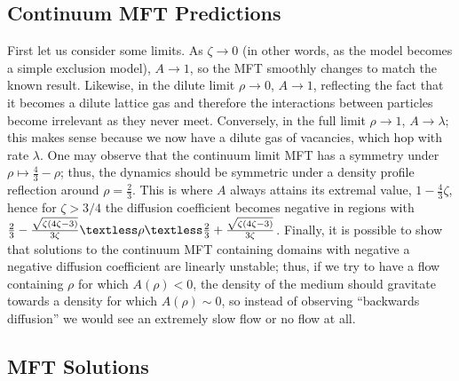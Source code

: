 \subsection{Continuum MFT Predictions}
First let us consider some limits. As $\zeta \rightarrow 0$ (in other words, as the model becomes a simple exclusion model), $A \rightarrow 1$, so the MFT smoothly changes to match the known result. Likewise, in the
dilute limit $\rho \rightarrow 0$, $A \rightarrow 1$, reflecting the fact that it becomes a dilute lattice gas and therefore the interactions between particles become irrelevant as they never meet.
Conversely, in the full limit $\rho \rightarrow 1$, $A \rightarrow \lambda$; this makes sense because we now have a dilute gas of vacancies, which hop with rate $\lambda$.
One may observe that the continuum limit MFT has a symmetry under $\rho \mapsto \frac{4}{3} - \rho$; thus, the dynamics should be symmetric under a density profile reflection around $\rho = \frac{2}{3}$. This is where $A$ always
attains its extremal value, $ 1 - \frac{4}{3}\zeta$, hence for $\zeta>3/4$ the diffusion coefficient becomes negative in regions with
$\frac{2}{3} - \frac{\sqrt{\zeta\left(4\zeta - 3\right)}}{3\zeta} \textless \rho \textless \frac{2}{3} + \frac{\sqrt{\zeta\left(4\zeta - 3\right)}}{3\zeta}$.
Finally, it is possible to show that solutions to the continuum MFT containing domains with negative a negative diffusion coefficient are linearly unstable; thus, if we try to have a flow containing $\rho$ for which $A(\rho)<0$,
the density of the medium should gravitate towards a density for which $A(\rho)\sim 0$, so instead of observing ``backwards diffusion'' we would see an extremely slow flow or no flow at all.
\subsection{MFT Solutions}
